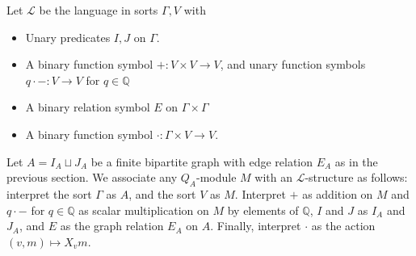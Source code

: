 \documentclass{amsart}
\theoremstyle{definition}
\theoremstyle{remark}
\numberwithin{equation}{section}
\begin{document}
Let $\mathcal{L}$ be the language in sorts $\Gamma, V$ with

\begin{itemize}
\item Unary predicates $I, J$ on $\Gamma$.

    \item A binary function symbol $+: V \times V \to V$, and unary function symbols $q \cdot -: V \to V$ for $q \in \mathbb{Q}$

    \item A binary relation symbol $E$ on $\Gamma \times \Gamma$

    \item A binary function symbol $\cdot: \Gamma \times V \to V$.
\end{itemize}


Let $A = I_{A} \sqcup J_{A}$ be a finite bipartite graph with edge relation $E_{A}$ as in the previous section. We associate any $Q_{A}$-module $M$ with an $\mathcal{L}$-structure as follows: interpret the sort $\Gamma$ as $A$, and the sort $V$ as $M$. Interpret $+$ as addition on $M$ and $q \cdot -$ for $q \in \mathbb{Q}$ as scalar multiplication on $M$ by elements of $\mathbb{Q}$, $I$ and $J$ as $I_{A}$ and $J_{A}$, and $E$ as the graph relation $E_{A}$ on $A$. Finally, interpret $\cdot$ as the action $(v, m) \mapsto X_{v}m$.
\end{document}
